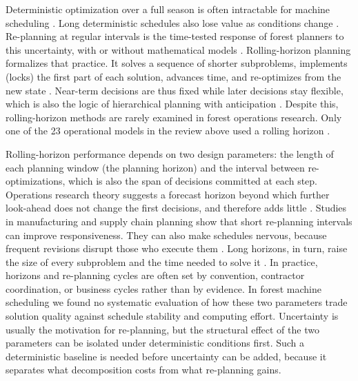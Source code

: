 Deterministic optimization over a full season is often intractable for machine scheduling
\citep{bellavenutte2020partitioning}. Long deterministic schedules also lose value as conditions
change \citep{sethi1991theory}. Re-planning at regular intervals is the time-tested response of
forest planners to this uncertainty, with or without mathematical models
\citep{martell1998forest,ulvdal2022uncertainty}. Rolling-horizon planning formalizes that
practice. It solves a sequence of shorter subproblems, implements (locks) the first part of each
solution, advances time, and re-optimizes from the new state \citep{baker1979analytic,
venkataraman1999effect}. Near-term decisions are thus fixed while later decisions stay flexible,
which is also the logic of hierarchical planning with anticipation
\citep{beaudoin2008hierarchical,feng2010simulation}. Despite this, rolling-horizon methods are
rarely examined in forest operations research. Only one of the 23 operational models in the review
above used a rolling horizon \citep{arora2023detailed,jaffray2026thesis}.

Rolling-horizon performance depends on two design parameters: the length of each planning window
(the planning horizon) and the interval between re-optimizations, which is also the span of
decisions committed at each step. Operations research theory suggests a forecast horizon beyond
which further look-ahead does not change the first decisions, and therefore adds little
\citep{baker1979analytic,sethi1991theory,chand2002forecast}. Studies in manufacturing and supply
chain planning show that short re-planning intervals can improve responsiveness. They can also
make schedules nervous, because frequent revisions disrupt those who execute them
\citep{venkataraman1999effect,sahin2008master,herding2024rolling}. Long horizons, in turn, raise
the size of every subproblem and the time needed to solve it \citep{santos2021integrated}. In
practice, horizons and re-planning cycles are often set by convention, contractor coordination,
or business cycles rather than by evidence. In forest machine scheduling we found no systematic
evaluation of how these two parameters trade solution quality against schedule stability and
computing effort. Uncertainty is usually the motivation for re-planning, but the structural
effect of the two parameters can be isolated under deterministic conditions first. Such a
deterministic baseline is needed before uncertainty can be added, because it separates what
decomposition costs from what re-planning gains.

